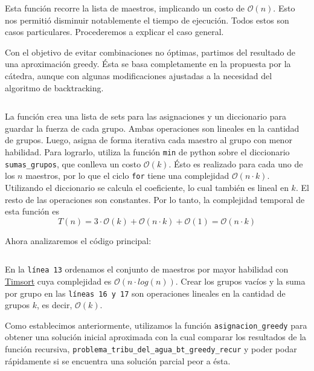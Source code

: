 \documentclass{article}
\begin{document}
\inputminted[linenos, firstline=75, lastline=81]{python}{codigo/backtracking_con_greedy.py}

Esta función recorre la lista de maestros, implicando un costo de $\mathcal{O}(n)$. Esto nos permitió disminuir notablemente el tiempo de ejecución. Todos estos son casos particulares. Procederemos a explicar el caso general. 

Con el objetivo de evitar combinaciones no óptimas, partimos del resultado de una aproximación greedy. Ésta se basa completamente en la propuesta por la cátedra, aunque con algunas modificaciones ajustadas a la necesidad del algoritmo de backtracking.

\inputminted[linenos, firstline=83]{python}{codigo/backtracking_con_greedy.py}

La función crea una lista de sets para las asignaciones y un diccionario para guardar la fuerza de cada grupo. Ambas operaciones son lineales en la cantidad de grupos. Luego, asigna de forma iterativa cada maestro al grupo con menor habilidad. Para lograrlo, utiliza la función \texttt{min} de python sobre el diccionario \texttt{sumas\_grupos}, que conlleva un costo $\mathcal{O}(k)$. Ésto es realizado para cada uno de los $n$ maestros, por lo que el ciclo \texttt{for} tiene una complejidad $\mathcal{O}(n \cdot k)$. Utilizando el diccionario se calcula el coeficiente, lo cual también es lineal en $k$. El resto de las operaciones son constantes. Por lo tanto, la complejidad temporal de esta función es 
$$
T(n) = 3 \cdot \mathcal{O}(k) + \mathcal{O}(n \cdot k) + \mathcal{O}(1) = \mathcal{O}(n \cdot k)
$$

Ahora analizaremos el código principal:
\inputminted[linenos, lastline=28]{python}{codigo/backtracking_con_greedy.py}

En la \texttt{línea 13} ordenamos el conjunto de maestros por mayor habilidad con \href{https://svn.python.org/projects/python/trunk/Objects/listsort.txt}{Timsort} cuya complejidad es $\mathcal{O}(n \cdot log(n))$. Crear los grupos vacíos y la suma por grupo en las \texttt{líneas 16 y 17} son operaciones lineales en la cantidad de grupos $k$, es decir, $\mathcal{O}(k)$. 

Como establecimos anteriormente, utilizamos la función \texttt{asignacion\_greedy} para obtener una solución inicial aproximada con la cual comparar los resultados de la función recursiva, \texttt{problema\_tribu\_del\_agua\_bt\_greedy\_recur} y poder podar rápidamente si se encuentra una solución parcial peor a ésta.
\end{document}
